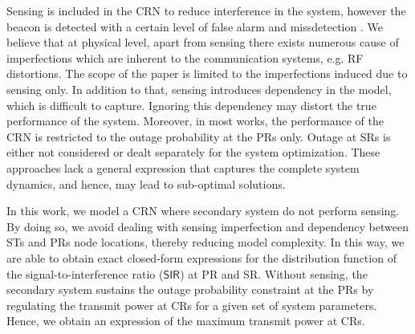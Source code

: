\documentclass[conference, twocolumn]{IEEEtran}
\begin{document}
Sensing is included in the CRN to reduce interference in the system, however the beacon is detected with a certain level of false alarm and missdetection \cite{Tan12}. 
We believe that at physical level, apart from sensing there exists numerous cause of imperfections which are inherent to the communication systems, e.g. RF distortions. The scope of the paper is limited to the imperfections induced due to sensing only. 
In addition to that, sensing introduces dependency in the model, which is difficult to capture. Ignoring this dependency may distort the true performance of the system. 
Moreover, in most works, the performance of the CRN is restricted to the outage probability at the PRs only. Outage at SRs is either not considered or dealt separately for the system optimization. These approaches lack a general expression that captures the complete system dynamics, and hence, may lead to sub-optimal solutions. %

 
In this work, we model a CRN where secondary system do not perform sensing. By doing so, we avoid dealing with sensing imperfection and dependency between STs and PRs node locations, thereby reducing model complexity. 
In this way, we are able to obtain exact closed-form expressions for the distribution function of the signal-to-interference ratio ($\textsf{SIR}$) at PR and SR. 
Without sensing, the secondary system sustains the outage probability constraint at the PRs by regulating the transmit power at CRs for a given set of system parameters.  
Hence, we obtain an expression of the maximum transmit power at CRs.  
\end{document}
